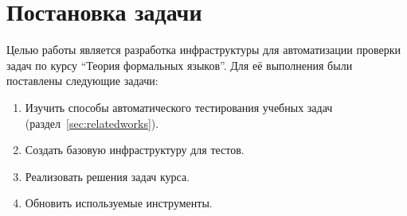 
\section{Постановка задачи}
\label{sec:task}

Целью работы является разработка инфраструктуры для автоматизации проверки задач по курсу \enquote{Теория формальных языков}.
Для её выполнения были поставлены следующие задачи:
\begin{enumerate}
    \item Изучить способы автоматического тестирования учебных задач (раздел~\ref{sec:relatedworks}). %
    \item Создать базовую инфраструктуру для тестов.
    \item Реализовать решения задач курса.
    \item Обновить используемые инструменты. 
\end{enumerate}
